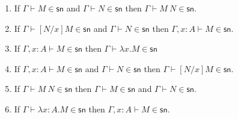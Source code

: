 \documentclass{article}
\newcommand{\csn}{\mathsf{sn}}
\newcommand{\red}{\longrightarrow}
\begin{document}
\begin{lemma}\label{lem:psn}$\;$
  \begin{enumerate}
  \item\label{pp2} If $\Gamma \vdash M \in \csn$ and $\Gamma \vdash N \in \csn$
    then $\Gamma \vdash M~N \in \csn$.
  \item\label{pp3} If $\Gamma \vdash [N/x]M \in \csn$ and $\Gamma \vdash N \in
    \csn$ then $\Gamma, x{:}A \vdash M \in \csn$.
  \item\label{pp4} If $\Gamma, x{:}A \vdash M \in \csn$ then $\Gamma \vdash  \lambda x.M \in \csn$
  \item\label{pp5} If $\Gamma, x{:}A \vdash M \in \csn$ and $\Gamma \vdash N \in
   \csn$ then $\Gamma \vdash [N/x]M \in \csn$.  
  \item\label{pp6} If $\Gamma \vdash M~N \in \csn$ then $\Gamma \vdash M \in \csn$ and $\Gamma \vdash N \in \csn$.
  \item\label{pp7} If $\Gamma \vdash \lambda x{:}A.M \in \csn$ then $\Gamma, x{:}A \vdash M \in \csn$.

  \end{enumerate} 
\end{lemma}
\end{document}
